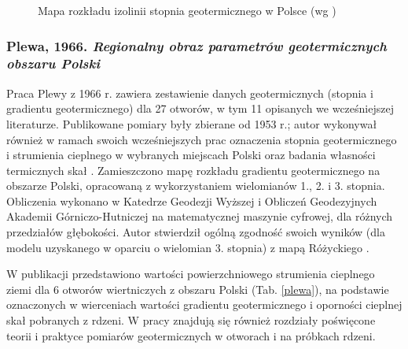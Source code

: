 \documentclass[11.5pt,twoside]{report}
\newcommand{\ct}[1]{\ignorespaces} %
\begin{document}
\begin{figure}[h]
	\centering
	\caption{Mapa rozkładu izolinii stopnia geotermicznego w Polsce (wg \cite{Rozycki.1948})}
	\label{rozycki}
\end{figure}
	
\subsubsection{Plewa, 1966. \textit{Regionalny obraz parametrów geotermicznych obszaru Polski}}
Praca Plewy z 1966 r. zawiera zestawienie danych geotermicznych (stopnia i gradientu geotermicznego) dla 27 otworów, w tym 11 opisanych we wcześniejszej literaturze. Publikowane pomiary były zbierane od 1953 r.; autor wykonywał również w ramach swoich wcześniejszych prac oznaczenia stopnia geotermicznego i strumienia cieplnego w wybranych miejscach Polski oraz badania własności termicznych skał \ct{parencite{Plewa.1961,Plewa.1963a,Plewa.1963b,Plewa.1965}}. Zamieszczono mapę rozkładu gradientu geotermicznego na obszarze Polski, opracowaną z wykorzystaniem wielomianów 1., 2. i 3. stopnia. Obliczenia wykonano w Katedrze Geodezji Wyższej i Obliczeń Geodezyjnych Akademii Górniczo-Hutniczej na matematycznej maszynie cyfrowej, dla różnych przedziałów głębokości. Autor stwierdził ogólną zgodność swoich wyników (dla modelu uzyskanego w oparciu o wielomian 3. stopnia) z mapą Różyckiego \citeyear{Rozycki.1948}. 

W publikacji przedstawiono wartości powierzchniowego strumienia cieplnego ziemi dla 6 otworów wiertniczych z obszaru Polski (Tab. \ref{plewa}), na podstawie oznaczonych w wierceniach wartości gradientu geotermicznego i oporności cieplnej skał pobranych z rdzeni. W pracy znajdują się również rozdziały poświęcone teorii i praktyce pomiarów geotermicznych w otworach i na próbkach rdzeni. 
\end{document}
